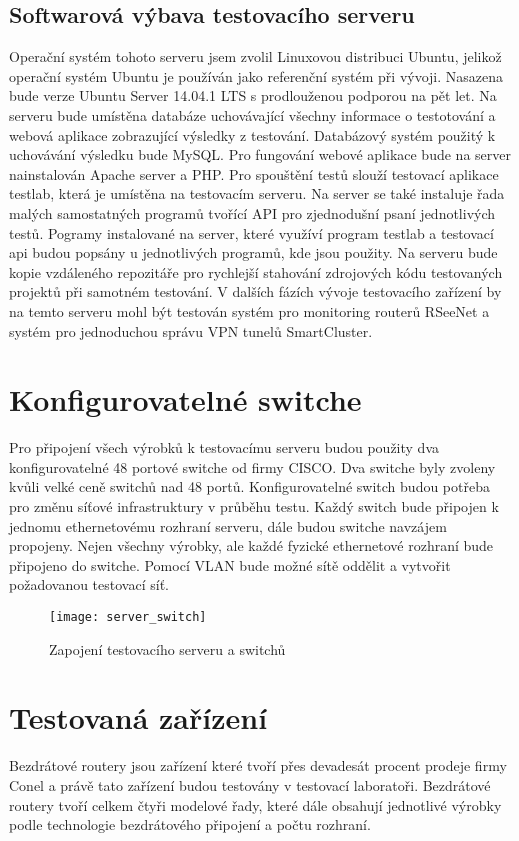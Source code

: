 \subsection{Softwarová výbava testovacího serveru}
Operační systém tohoto serveru jsem zvolil Linuxovou distribuci Ubuntu, jelikož operační systém Ubuntu je používán jako referenční systém při vývoji. Nasazena bude verze Ubuntu Server 14.04.1 LTS s prodlouženou podporou na pět let. Na serveru bude umístěna databáze uchovávající všechny informace o testotování a webová aplikace zobrazující výsledky z testování. Databázový systém použitý k uchovávání výsledku bude MySQL. Pro fungování webové aplikace bude na server nainstalován Apache server a PHP. Pro spouštění testů slouží testovací aplikace testlab, která je umístěna na testovacím serveru. Na server se také instaluje řada malých samostatných programů tvořící API pro zjednodušní psaní jednotlivých testů. Pogramy instalované na server, které využíví program testlab a testovací api budou popsány u jednotlivých programů, kde jsou použity. Na serveru bude kopie vzdáleného repozitáře pro rychlejší stahování zdrojových kódu testovaných projektů při samotném testování.  V dalších fázích vývoje testovacího zařízení by na temto serveru mohl být testován systém pro monitoring routerů RSeeNet a systém pro jednoduchou správu VPN tunelů SmartCluster.

\section{Konfigurovatelné switche}
Pro připojení všech výrobků k testovacímu serveru budou použity dva konfigurovatelné 48 portové switche od firmy CISCO. Dva switche byly zvoleny kvůli velké ceně switchů nad 48 portů. Konfigurovatelné switch budou potřeba pro změnu síťové infrastruktury v průběhu testu. Každý switch bude připojen k jednomu ethernetovému rozhraní serveru, dále budou switche navzájem propojeny. Nejen všechny výrobky, ale každé fyzické ethernetové rozhraní bude připojeno do switche. Pomocí VLAN bude možné sítě oddělit a vytvořit požadovanou testovací síť.

\begin{figure}[h]
  \centering
  \texttt{[image: server\_switch]}
  \caption{Zapojení testovacího serveru a switchů}
  \label{fig:server_switch}
\end{figure}

\section{Testovaná zařízení}
Bezdrátové routery jsou zařízení které tvoří přes devadesát procent prodeje firmy Conel a právě tato zařízení budou testovány v testovací laboratoři. Bezdrátové routery tvoří celkem čtyři modelové řady, které dále obsahují jednotlivé výrobky podle technologie bezdrátového připojení a počtu rozhraní.

